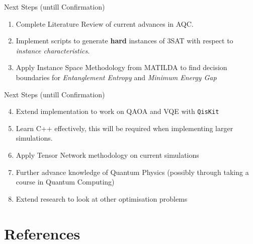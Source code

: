 \documentclass[
  ignorenonframetext,
]{beamer}
\providecommand{\tightlist}{%
  \setlength{\itemsep}{0pt}\setlength{\parskip}{0pt}}
\begin{document}
\begin{frame}{Next Steps (untill Confirmation)}
\protect\hypertarget{next-steps-untill-confirmation}{}

\begin{enumerate}[<+->]
\tightlist
\item
  Complete Literature Review of current advances in AQC.
\item
  Implement scripts to generate \textbf{hard} instances of 3SAT with
  respect to \emph{instance characteristics}.
\item
  Apply Instance Space Methodology from MATILDA to find decision
  boundaries for \emph{Entanglement Entropy} and \emph{Minimum Energy
  Gap}
\end{enumerate}

\end{frame}

\begin{frame}[fragile]{Next Steps (untill Confirmation)}
\protect\hypertarget{next-steps-untill-confirmation-1}{}

\begin{enumerate}[<+->]
\setcounter{enumi}{3}
\tightlist
\item
  Extend implementation to work on QAOA and VQE with \texttt{QisKit}
\item
  Learn C++ effectively, this will be required when implementing larger
  simulations.
\item
  Apply Tensor Network methodology on current simulations
\item
  Further advance knowledge of Quantum Physics (possibly through taking
  a course in Quantum Computing)
\item
  Extend research to look at other optimisation problems
\end{enumerate}

\end{frame}

\hypertarget{references}{%
\section{References}\label{references}}
\end{document}
